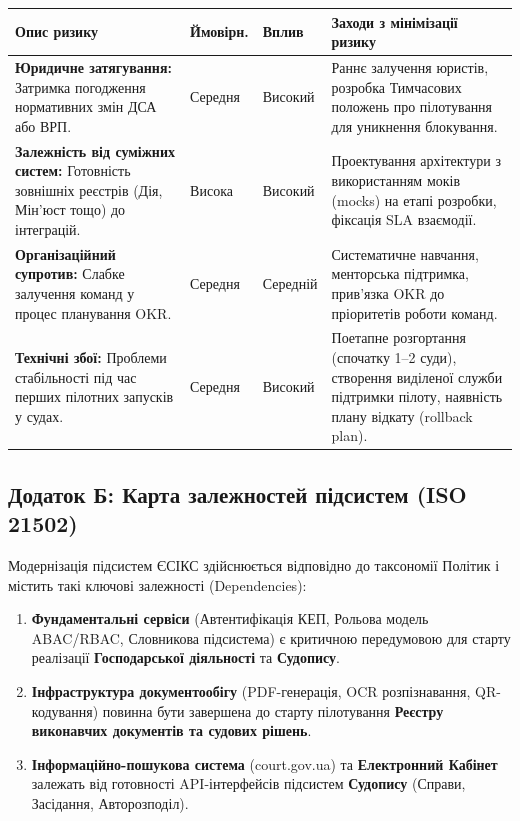 \documentclass{article}
\begin{document}
\begin{longtable}{@{}p{4.0cm}p{1.5cm}p{1.5cm}p{6.5cm}@{}}
\toprule
\textbf{Опис ризику} & \textbf{Ймовірн.} & \textbf{Вплив} & \textbf{Заходи з мінімізації ризику} \\
\midrule
\textbf{Юридичне затягування:} Затримка погодження нормативних змін ДСА або ВРП. & Середня & Високий & Раннє залучення юристів, розробка Тимчасових положень про пілотування для уникнення блокування. \\
\midrule
\textbf{Залежність від суміжних систем:} Готовність зовнішніх реєстрів (Дія, Мін'юст тощо) до інтеграцій. & Висока & Високий & Проектування архітектури з використанням моків (mocks) на етапі розробки, фіксація SLA взаємодії. \\
\midrule
\textbf{Організаційний супротив:} Слабке залучення команд у процес планування OKR. & Середня & Середній & Систематичне навчання, менторська підтримка, прив'язка OKR до пріоритетів роботи команд. \\
\midrule
\textbf{Технічні збої:} Проблеми стабільності під час перших пілотних запусків у судах. & Середня & Високий & Поетапне розгортання (спочатку 1--2 суди), створення виділеної служби підтримки пілоту, наявність плану відкату (rollback plan). \\
\bottomrule
\end{longtable}

\subsection{Додаток Б: Карта залежностей підсистем (ISO 21502)}
Модернізація підсистем ЄСІКС здійснюється відповідно до таксономії Політик і містить такі ключові залежності (Dependencies):
\begin{enumerate}
    \item \textbf{Фундаментальні сервіси} (Автентифікація КЕП, Рольова модель ABAC/RBAC, Словникова підсистема) є критичною передумовою для старту реалізації \textbf{Господарської діяльності} та \textbf{Судопису}.
    \item \textbf{Інфраструктура документообігу} (PDF-генерація, OCR розпізнавання, QR-кодування) повинна бути завершена до старту пілотування \textbf{Реєстру виконавчих документів та судових рішень}.
    \item \textbf{Інформаційно-пошукова система} (court.gov.ua) та \textbf{Електронний Кабінет} залежать від готовності API-інтерфейсів підсистем \textbf{Судопису} (Справи, Засідання, Авторозподіл).
\end{enumerate}
\end{document}
